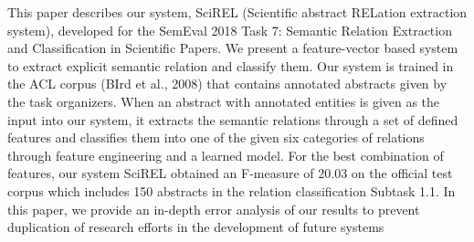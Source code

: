 This paper describes our system, SciREL (Scientific abstract RELation extraction system), developed for the SemEval 2018 Task 7: Semantic Relation Extraction and Classification in Scientific Papers. We present a feature-vector based system to extract explicit semantic relation and classify them. Our system is trained in the ACL corpus (BIrd et al., 2008) that contains annotated abstracts given by the task organizers. When an abstract with annotated entities is given as the input into our system, it extracts the semantic relations through a set of defined features and classifies them into one of the given six categories of relations through feature engineering and a learned model. For the best combination of features, our system SciREL obtained an F-measure of 20.03 on the official test corpus which includes 150 abstracts in the relation classification Subtask 1.1. In this paper, we provide an in-depth error analysis of our results to prevent duplication of research efforts in the development of future systems
